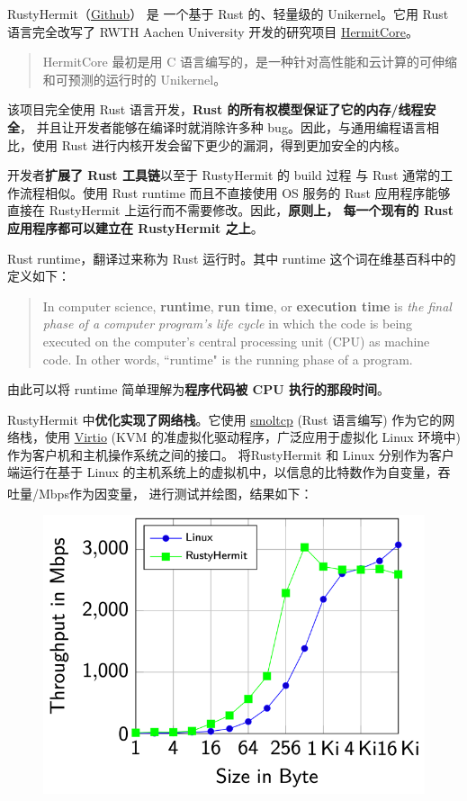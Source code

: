 \documentclass[UTF8,fontset=none,linespread=1.15]{ctexart}
\let\nosupcite\cite
\renewcommand*{\cite}[1]{\textsuperscript{\nosupcite{#1}}}
\begin{document}
RustyHermit（\href{https://github.com/hermitcore/rusty-hermit}{Github}） 是
一个基于 Rust 的、轻量级的 Unikernel。它用 Rust 语言完全改写了 RWTH Aachen University
 开发的研究项目 \href{http://hermitcore.org/}{HermitCore}。

\begin{quote}
HermitCore 最初是用 C 语言编写的，是一种针对高性能和云计算的可伸缩和可预测的运行时的 Unikernel。
\end{quote}

该项目完全使用 Rust 语言开发，\textbf{Rust 的所有权模型保证了它的内存/线程安全}，
并且让开发者能够在编译时就消除许多种 bug。因此，与通用编程语言相比，使用 Rust
 进行内核开发会留下更少的漏洞，得到更加安全的内核。

开发者\textbf{扩展了 Rust 工具链}以至于 RustyHermit 的 build 过程
与 Rust 通常的工作流程相似。使用 Rust runtime 而且不直接使用 OS 服务的
 Rust 应用程序能够直接在 RustyHermit 上运行而不需要修改。因此，\textbf{原则上，
 每一个现有的 Rust 应用程序都可以建立在 RustyHermit 之上}。

Rust runtime，翻译过来称为 Rust 运行时。其中 runtime 这个词在维基百科中的定义如下：
\begin{quote}
In computer science, \textbf{runtime}, \textbf{run time}, or \textbf{execution time} is \textit{the final phase of a computer program's life cycle} in which the code is being executed on the computer's central processing unit (CPU) as machine code. In other words, ``runtime" is the running phase of a program.
\end{quote}
由此可以将 runtime 简单理解为\textbf{程序代码被 CPU 执行的那段时间}。

RustyHermit 中\textbf{优化实现了网络栈}。它使用 \href{https://github.com/smoltcp-rs/smoltcp}{smoltcp} (Rust 语言编写)
作为它的网络栈，使用 \href{https://www.linux-kvm.org/page/Virtio}{Virtio}
(KVM 的准虚拟化驱动程序，广泛应用于虚拟化 Linux 环境中) 作为客户机和主机操作系统之间的接口。
将RustyHermit 和 Linux 分别作为客户端运行在基于 Linux 的主机系统上的虚拟机中，以信息的比特数作为自变量，吞吐量/Mbps作为因变量，
进行测试并绘图，结果如下：\cite{bib:20-linux-kernel}
\begin{figure}[H]
\includegraphics[width=\linewidth]{pictures/RustyHermit-1.png}
\caption{}
\end{figure}
\end{document}

